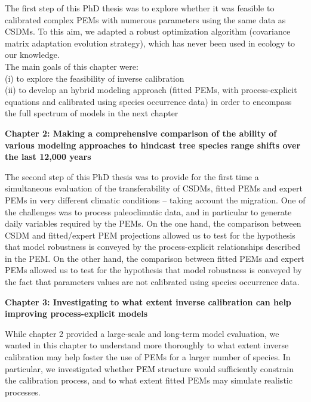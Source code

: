 \vspace*{0.1cm}

\noindent The first step of this PhD thesis was to explore whether it was feasible to calibrated complex PEMs with numerous parameters using the same data as CSDMs. To this aim, we adapted a robust optimization algorithm (covariance matrix adaptation evolution strategy), which has never been used in ecology to our knowledge. \\
The main goals of this chapter were: \\
(i) to explore the feasibility of inverse calibration\\
(ii) to develop an hybrid modeling approach (fitted PEMs, with process-explicit equations and calibrated using species occurrence data) in order to encompass the full spectrum of models in the next chapter

\vspace*{0.5cm}

\textbf{Chapter 2: Making a comprehensive comparison of the ability of various modeling approaches to hindcast tree species range shifts over the last 12,000 years}

\vspace*{0.1cm}

\noindent The second step of this PhD thesis was to provide for the first time a simultaneous evaluation of the transferability of CSDMs, fitted PEMs and expert PEMs in very different climatic conditions -- taking account the migration. One of the challenges was to process paleoclimatic data, and in particular to generate daily variables required by the PEMs. On the one hand, the comparison between CSDM and fitted/expert PEM projections allowed us to test for the hypothesis that model robustness is conveyed by the process-explicit relationships described in the PEM. On the other hand, the comparison between fitted PEMs and expert PEMs allowed us to test for the hypothesis that model robustness is conveyed by the fact that parameters values are not calibrated using species occurrence data.

\vspace*{0.5cm}

\textbf{Chapter 3: Investigating to what extent inverse calibration can help improving process-explicit models}

\vspace*{0.1cm}

\noindent While chapter 2 provided a large-scale and long-term model evaluation, we wanted in this chapter to understand more thoroughly to what extent inverse calibration may help foster the use of PEMs for a larger number of species. In particular, we investigated whether PEM structure would sufficiently constrain the calibration process, and to what extent fitted PEMs may simulate realistic processes.

